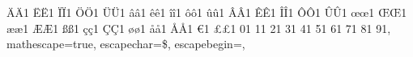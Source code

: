 {    {Ä}{{\"A}}1  {Ë}{{\"E}}1 {Ï}{{\"I}}1 {Ö}{{\"O}}1  {Ü}{{\"U}}1
    {â}{{\^a}}1  {ê}{{\^e}}1 {î}{{\^i}}1 {ô}{{\^o}}1  {û}{{\^u}}1
    {Â}{{\^A}}1  {Ê}{{\^E}}1 {Î}{{\^I}}1 {Ô}{{\^O}}1  {Û}{{\^U}}1
    {œ}{{\oe}}1  {Œ}{{\OE}}1 {æ}{{\ae}}1 {Æ}{{\AE}}1  {ß}{{\ss}}1
    {ç}{{\c c}}1 {Ç}{{\c C}}1 {ø}{{\o}}1 {å}{{\r a}}1 {Å}{{\r A}}1
    {€}{{\EUR}}1 {£}{{\pounds}}1
    {0}{{{}}}1
    {1}{{{}}}1
    {2}{{{}}}1
    {3}{{{}}}1
    {4}{{{}}}1
    {5}{{{}}}1
    {6}{{{}}}1
    {7}{{{}}}1
    {8}{{{}}}1
    {9}{{{}}}1,
  mathescape=true,
  escapechar=\$,
  escapebegin=\color{vscodeComment},
}
